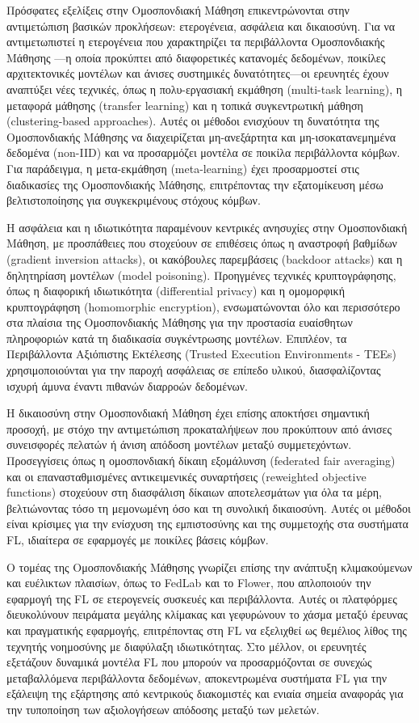 Πρόσφατες εξελίξεις στην Ομοσπονδιακή Μάθηση επικεντρώνονται στην αντιμετώπιση βασικών προκλήσεων: ετερογένεια, ασφάλεια και δικαιοσύνη. Για να αντιμετωπιστεί η ετερογένεια που χαρακτηρίζει τα περιβάλλοντα Ομοσπονδιακής Μάθησης —η οποία προκύπτει από διαφορετικές κατανομές δεδομένων, ποικίλες αρχιτεκτονικές μοντέλων και άνισες συστημικές δυνατότητες—οι ερευνητές έχουν αναπτύξει νέες τεχνικές, όπως η πολυ-εργασιακή εκμάθηση (multi-task learning), η μεταφορά μάθησης (transfer learning) και η τοπικά συγκεντρωτική μάθηση (clustering-based approaches). Αυτές οι μέθοδοι ενισχύουν τη δυνατότητα της Ομοσπονδιακής Μάθησης να διαχειρίζεται μη-ανεξάρτητα και μη-ισοκατανεμημένα δεδομένα (non-IID) και να προσαρμόζει μοντέλα σε ποικίλα περιβάλλοντα κόμβων. Για παράδειγμα, η μετα-εκμάθηση (meta-learning) έχει προσαρμοστεί στις διαδικασίες της Ομοσπονδιακής Μάθησης, επιτρέποντας την εξατομίκευση μέσω βελτιστοποίησης για συγκεκριμένους στόχους κόμβων.

Η ασφάλεια και η ιδιωτικότητα παραμένουν κεντρικές ανησυχίες στην Ομοσπονδιακή Μάθηση, με προσπάθειες που στοχεύουν σε επιθέσεις όπως η αναστροφή βαθμίδων (gradient inversion attacks), οι κακόβουλες παρεμβάσεις (backdoor attacks) και η δηλητηρίαση μοντέλων (model poisoning). Προηγμένες τεχνικές κρυπτογράφησης, όπως η διαφορική ιδιωτικότητα (differential privacy) και η ομομορφική κρυπτογράφηση (homomorphic encryption), ενσωματώνονται όλο και περισσότερο στα πλαίσια της Ομοσπονδιακής Μάθησης για την προστασία ευαίσθητων πληροφοριών κατά τη διαδικασία συγκέντρωσης μοντέλων. Επιπλέον, τα Περιβάλλοντα Αξιόπιστης Εκτέλεσης (Trusted Execution Environments - TEEs) χρησιμοποιούνται για την παροχή ασφάλειας σε επίπεδο υλικού, διασφαλίζοντας ισχυρή άμυνα έναντι πιθανών διαρροών δεδομένων.

Η δικαιοσύνη στην Ομοσπονδιακή Μάθηση έχει επίσης αποκτήσει σημαντική προσοχή, με στόχο την αντιμετώπιση προκαταλήψεων που προκύπτουν από άνισες συνεισφορές πελατών ή άνιση απόδοση μοντέλων μεταξύ συμμετεχόντων. Προσεγγίσεις όπως η ομοσπονδιακή δίκαιη εξομάλυνση (federated fair averaging) και οι επανασταθμισμένες αντικειμενικές συναρτήσεις (reweighted objective functions) στοχεύουν στη διασφάλιση δίκαιων αποτελεσμάτων για όλα τα μέρη, βελτιώνοντας τόσο τη μεμονωμένη όσο και τη συνολική δικαιοσύνη. Αυτές οι μέθοδοι είναι κρίσιμες για την ενίσχυση της εμπιστοσύνης και της συμμετοχής στα συστήματα FL, ιδιαίτερα σε εφαρμογές με ποικίλες βάσεις κόμβων.

Ο τομέας της Ομοσπονδιακής Μάθησης γνωρίζει επίσης την ανάπτυξη κλιμακούμενων και ευέλικτων πλαισίων, όπως το FedLab και το Flower, που απλοποιούν την εφαρμογή της FL σε ετερογενείς συσκευές και περιβάλλοντα. Αυτές οι πλατφόρμες διευκολύνουν πειράματα μεγάλης κλίμακας και γεφυρώνουν το χάσμα μεταξύ έρευνας και πραγματικής εφαρμογής, επιτρέποντας στη FL να εξελιχθεί ως θεμέλιος λίθος της τεχνητής νοημοσύνης με διαφύλαξη ιδιωτικότητας. Στο μέλλον, οι ερευνητές εξετάζουν δυναμικά μοντέλα FL που μπορούν να προσαρμόζονται σε συνεχώς μεταβαλλόμενα περιβάλλοντα δεδομένων, αποκεντρωμένα συστήματα FL για την εξάλειψη της εξάρτησης από κεντρικούς διακομιστές και ενιαία σημεία αναφοράς για την τυποποίηση των αξιολογήσεων απόδοσης μεταξύ των μελετών.

